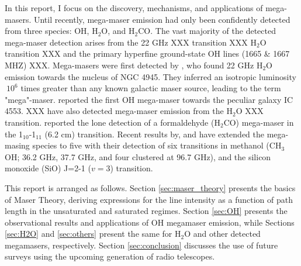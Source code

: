 In this report, I focus on the discovery, mechanisms, and applications of mega-masers. Until recently, mega-maser emission had only been confidently detected from three species: OH, H$_2$O, and H$_2$CO. The vast majority of the detected mega-maser detection arises from the 22 GHz XXX transition XXX H$_2$O transition XXX and the primary hyperfine ground-state OH lines (1665 \& 1667 MHZ) XXX. Mega-masers were first detected by \citet{DOS_SANTOS_1979}, who found 22 GHz H$_2$O emission towards the nucleus of NGC 4945. They inferred an isotropic luminosity $~10^6$ times greater than any known galactic maser source, leading to the term "mega"-maser. \citet{Baan_1982} reported the first OH mega-maser towards the peculiar galaxy IC 4553. XXX have also detected mega-maser emission from the H$_2$O XXX transition. \citet{baan1986} reported the lone detection of a formaldehyde (H$_2$CO) mega-maser in the 1$_{10}$-1$_{11}$ (6.2 cm) transition. Recent results by, \citet{wang2014} and \citet{chen2015} have extended the mega-masing species to five with their detection of six transitions in methanol (CH$_3$OH; 36.2 GHz, 37.7 GHz, and four clustered at 96.7 GHz), and the silicon monoxide (SiO) J=2-1  ($v=3$) transition. 

This report is arranged as follows. Section \ref{sec:maser_theory} presents the basics of Maser Theory, deriving expressions for the line intensity as a function of path length in the unsaturated and saturated regimes. Section \ref{sec:OH} presents the observational results and applications of OH megamaser emission, while Sections \ref{sec:H2O} and \ref{sec:others} present the same for H$_2$O and other detected megamasers, respectively. Section \ref{sec:conclusion} discusses the use of future surveys using the upcoming generation of radio telescopes.